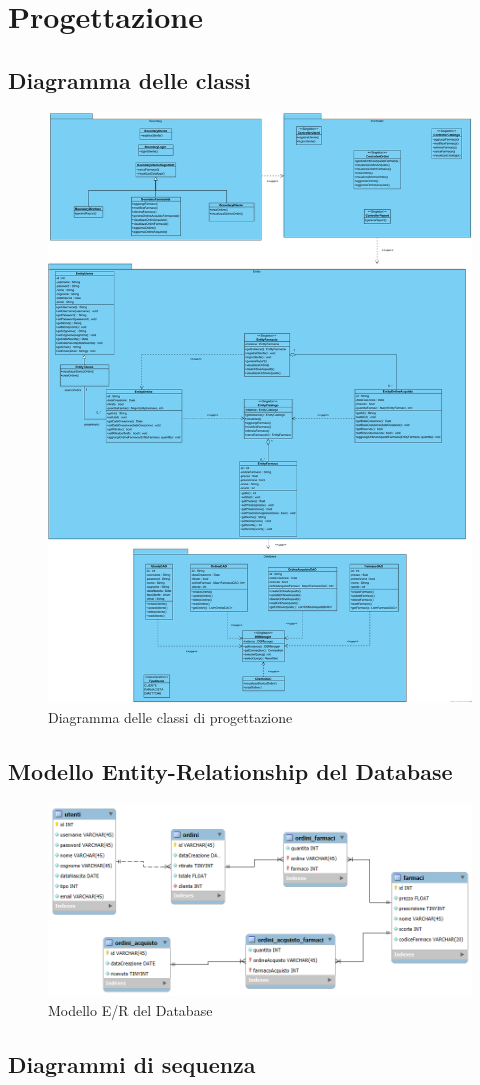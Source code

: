 \chapter{Progettazione}

\section{Diagramma delle classi}

\begin{figure}[h]
    \centering
	\includegraphics[width=0.7\linewidth]{assets/ClassDiagramProgettazione.png}
    \caption{Diagramma delle classi di progettazione}
\end{figure}

\pagebreak

\section{Modello Entity-Relationship del Database}

\begin{figure}[h]
    \centering
	\includegraphics[width=\linewidth]{assets/Modello_ER_DB.png}
    \caption{Modello E/R del Database}
\end{figure}

\section{Diagrammi di sequenza}